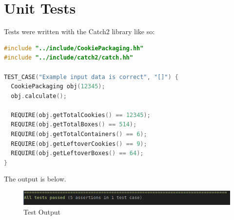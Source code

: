 \documentclass[a4paper, 11pt]{article}
\begin{document}
  \newpage
  \section{Unit Tests}
    Tests were written with the Catch2 library like so:

    \begin{lstlisting}[language=C++,caption={test/TestCase.cxx}]
#include "../include/CookiePackaging.hh"
#include "../include/catch2/catch.hh"

TEST_CASE("Example input data is correct", "[]") {
  CookiePackaging obj(12345);
  obj.calculate();

  REQUIRE(obj.getTotalCookies() == 12345);
  REQUIRE(obj.getTotalBoxes() == 514);
  REQUIRE(obj.getTotalContainers() == 6);
  REQUIRE(obj.getLeftoverCookies() == 9);
  REQUIRE(obj.getLeftoverBoxes() == 64);
}
    \end{lstlisting}

    The output is below.

    \begin{figure}[H]
      \caption{Test Output}
      \centering
      \includegraphics[width=\textwidth]{testout.png}
    \end{figure}
\end{document}
